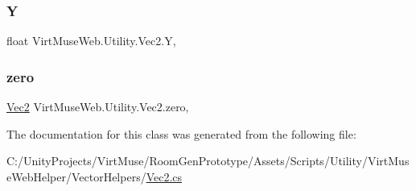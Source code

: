 \subsubsection{\texorpdfstring{Y}{Y}}
{\footnotesize\ttfamily float Virt\+Muse\+Web.\+Utility.\+Vec2.\+Y\hspace{0.3cm}{\ttfamily [get]}, {\ttfamily [set]}}

\mbox{\label{class_virt_muse_web_1_1_utility_1_1_vec2_a556e3d279f0c41b1627e63d10ec9d86d}} 
\subsubsection{\texorpdfstring{zero}{zero}}
{\footnotesize\ttfamily \mbox{\hyperlink{class_virt_muse_web_1_1_utility_1_1_vec2}{Vec2}} Virt\+Muse\+Web.\+Utility.\+Vec2.\+zero\hspace{0.3cm}{\ttfamily [static]}, {\ttfamily [get]}}



The documentation for this class was generated from the following file\+:\begin{DoxyCompactItemize}
\item 
C\+:/\+Unity\+Projects/\+Virt\+Muse/\+Room\+Gen\+Prototype/\+Assets/\+Scripts/\+Utility/\+Virt\+Muse\+Web\+Helper/\+Vector\+Helpers/\mbox{\hyperlink{_vec2_8cs}{Vec2.\+cs}}\end{DoxyCompactItemize}
